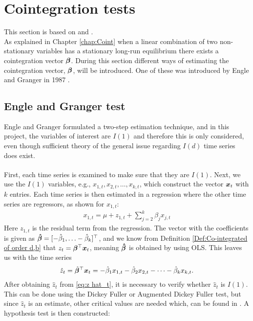 \chapter{Cointegration tests}\label{chap:coint tests}
This section is based on \cite{Analysis_of_integrated_and_cointegrated_time_series_with_R} and \cite{Engle_grang_test}.\\
\noindent As explained in Chapter \ref{chap:Coint} when a linear combination of two non-stationary variables has a stationary long-run equilibrium there exists a cointegration vector $\boldsymbol{\beta}$. During this section different ways of estimating the cointegration vector, $\boldsymbol{\beta}$, will be introduced. One of these was introduced by Engle and Granger in 1987 \cite{co-Integration_and_error_correction}.
\section{Engle and Granger test}
Engle and Granger formulated a two-step estimation technique, and in this project, the variables of interest are $I(1)$ and therefore this is only considered, even though sufficient theory of the general issue regarding $I(d)$ time series does exist. \\\\ 
First, each time series is examined to make sure that they are $I(1)$. Next, we use the $I(1)$ variables, e.g., $x_{1,t},x_{2,t},\ldots,x_{k,t}$, which construct the vector $\boldsymbol{x}_t$ with $k$ entries. Each time series is then estimated in a regression where the other time series are regressors, as shown for $x_{1,t}$:
\begin{align*}
    x_{1,t}=\mu+z_{1,t}+\sum^k_{j=2}\beta_j x_{j,t}
\end{align*}
Here $z_{1,t}$ is the residual term from the regression. The vector with the coefficients is given as $\boldsymbol{\hat{\beta}}=[-\hat{\beta}_1,\ldots-\hat{\beta}_k]^\top$, and we know from Definition \ref{Def:Co-integrated of order d,b} that $z_t=\boldsymbol{\beta}^\top \boldsymbol{x}_t$, meaning $\boldsymbol{\hat{\beta}}$ is obtained by using OLS. This leaves us with the time series
\begin{align}\label{eq:z hat_t}
\hat{z}_t=\hat{\boldsymbol{\beta}}^\top \boldsymbol{x}_t=-\hat{\beta}_{1}x_{1,t}-\hat{\beta}_{2}x_{2,t}-\cdots-\hat{\beta}_{k}x_{k,t}.
\end{align}
After obtaining $\hat{z}_t$ from \eqref{eq:z hat_t}, it is necessary to verify whether $\hat{z}_t$ is $I(1)$. This can be done using the Dickey Fuller or Augmented Dickey Fuller test, but since $\hat{z}_t$ is an estimate, other critical values are needed which, can be found in \cite{ENGLE1987143}. A hypothesis test is then constructed:
